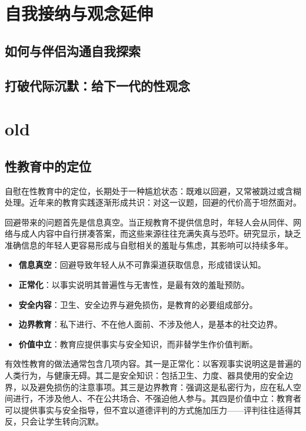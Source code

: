 \documentclass[12pt,UTF8]{ctexbook}
\newcommand{\keyword}[1]{\textbf{#1}}
\begin{document}
\section{自我接纳与观念延伸}

\subsection{如何与伴侣沟通自我探索}

\subsection{打破代际沉默：给下一代的性观念}

\section{old}

\subsection{性教育中的定位}

自慰在性教育中的定位，长期处于一种尴尬状态：既难以回避，又常被跳过或含糊处理。近年来的教育实践逐渐形成共识：对这一议题，回避的代价高于坦然面对。

回避带来的问题首先是信息真空。当正规教育不提供信息时，年轻人会从同伴、网络与成人内容中自行拼凑答案，而这些来源往往充满失真与恐吓。研究显示，缺乏准确信息的年轻人更容易形成与自慰相关的羞耻与焦虑，其影响可以持续多年。

\begin{itemize}
	\item \keyword{信息真空}：回避导致年轻人从不可靠渠道获取信息，形成错误认知。
	\item \keyword{正常化}：以事实说明其普遍性与无害性，是最有效的羞耻预防。
	\item \keyword{安全内容}：卫生、安全边界与避免损伤，是教育的必要组成部分。
	\item \keyword{边界教育}：私下进行、不在他人面前、不涉及他人，是基本的社交边界。
	\item \keyword{价值中立}：教育应提供事实与安全知识，而非替学生作价值判断。
\end{itemize}

有效性教育的做法通常包含几项内容。其一是正常化：以客观事实说明这是普遍的人类行为，与健康无碍。其二是安全知识：包括卫生、力度、器具使用的安全边界，以及避免损伤的注意事项。其三是边界教育：强调这是私密行为，应在私人空间进行，不涉及他人、不在公共场合、不强迫他人参与。其四是价值中立：教育者可以提供事实与安全指导，但不宜以道德评判的方式施加压力——评判往往适得其反，只会让学生转向沉默。
\end{document}
